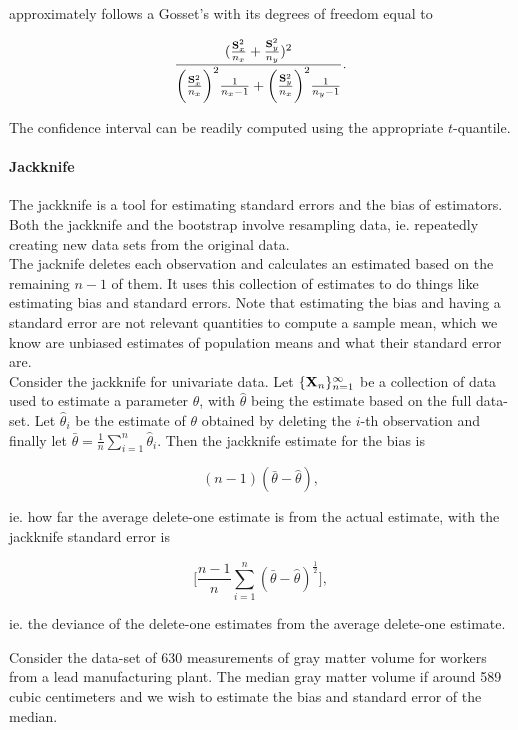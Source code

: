 \documentclass{homework}
\begin{document}
approximately follows a Gosset's \tdis with its degrees of freedom equal to 

$$
\frac{(\frac{{\bf S}_x^2}{n_x}+\frac{{\bf S}_y^2}{n_y})^2}{\bigg(\frac{{\bf S}_x^2}{n_x}\bigg)^2 \frac{1}{n_x-1}+\bigg(\frac{{\bf S}_y^2}{n_x}\bigg)^2 \frac{1}{n_y-1}}.
$$

The confidence interval can be readily computed using the appropriate $t$-quantile. \\

\paragraph{\textbf{Jackknife}}

The jackknife is a tool for estimating standard errors and the bias of estimators. Both the jackknife and the bootstrap involve resampling data, ie. repeatedly creating new data sets from the original data. \\

The jacknife deletes each observation and calculates an estimated based on the remaining $n-1$ of them. It uses this collection of estimates to do things like estimating bias and standard errors. Note that estimating the bias and having a standard error are not relevant quantities to compute a sample mean, which we know are unbiased estimates of population means and what their standard error are. \\

Consider the jackknife for univariate data. Let $\{{\bf X}_n\}_{n=1}^{\infty}$ be a collection of data used to estimate a parameter $\theta$, with $\hat{\theta}$ being the estimate based on the full data-set. Let $\hat{\theta}_i$ be the estimate of $\theta$ obtained by deleting the $i$-th observation and finally let $\bar{\theta}=\frac{1}{n}\sum_{i=1}^{n} \hat{\theta}_i$. Then the jackknife estimate for the bias is 

$$
(n-1)(\bar{\theta}-\hat{\theta}),
$$

ie. how far the average delete-one estimate is from the actual estimate, with the jackknife standard error is 

$$
\bigg[\frac{n-1}{n}\sum_{i=1}^{n} (\bar{\theta}-\hat{\theta})^{\frac{1}{2}}\bigg],
$$

ie. the deviance of the delete-one estimates from the average delete-one estimate. 

\begin{tcolorbox}[title=Example: Using the Jackknife]

Consider the data-set of $630$ measurements of gray matter volume for workers from a lead manufacturing plant. The median gray matter volume if around 589 cubic centimeters and we wish to estimate the bias and standard error of the median. 

\end{tcolorbox}
\end{document}
